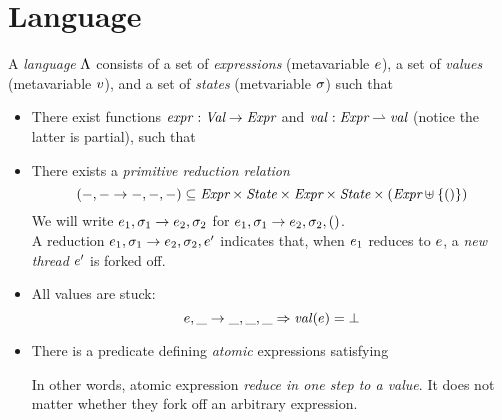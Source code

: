\section{Language}

A \emph{language} $\Lambda$ consists of a set  of \emph{expressions} (metavariable $e$), a set  of \emph{values} (metavariable $v$), and a set  of \emph{states} (metvariable $\sigma$) such that
\begin{itemize}
\item There exist functions $\mathit{expr} : \textit{Val} \to \textit{Expr}$ and $\mathit{val} : \textit{Expr} \rightharpoonup \textit{val}$ (notice the latter is partial), such that
\item There exists a \emph{primitive reduction relation} \[(-,- \rightarrow -,-,-) \subseteq \textit{Expr} \times \textit{State} \times \textit{Expr} \times \textit{State} \times (\textit{Expr} \uplus \left\{()\right\})\]
  We will write $e_1, \sigma_1 \rightarrow e_2, \sigma_2$ for $e_1, \sigma_1 \rightarrow e_2, \sigma_2, ()$. \\
  A reduction $e_1, \sigma_1 \rightarrow e_2, \sigma_2, e'$ indicates that, when $e_1$ reduces to $e$, a \emph{new thread} $e'$ is forked off.
\item All values are stuck:
\[ e, \_ \rightarrow  \_, \_, \_ \Rightarrow \mathit{val}(e) = \bot \]
\item There is a predicate defining \emph{atomic} expressions satisfying
\let\oldcr\cr
{}
In other words, atomic expression \emph{reduce in one step to a value}.
It does not matter whether they fork off an arbitrary expression.
\end{itemize}

